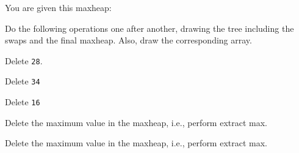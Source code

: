   You are given this maxheap:

  

  Do the following operations one after another,
  drawing the tree including the swaps
  and the final
  maxheap.
  Also, draw the corresponding array.
  \begin{tightlist}
  \item Delete \texttt{28}.
  \item Delete \texttt{34}
  \item Delete \texttt{16}
  \item Delete the maximum value in the maxheap, i.e., perform extract max.
  \item Delete the maximum value in the maxheap, i.e., perform extract max.
  \end{tightlist}
